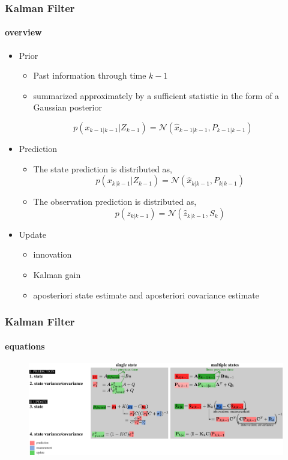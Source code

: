 \begin{frame}
\frametitle{Kalman Filter}
\framesubtitle{overview}
\logoCSIPCPL\mypagenum
	\begin{itemize}
		\item {\color{red}Prior}
			\begin{itemize}
				\item Past information through time $k-1$
				\item summarized approximately by a sufficient statistic in the form of a Gaussian posterior
			\end{itemize}
		\begin{equation*}
			p(x_{k-1|k-1}|Z_{k-1})=\mathcal{N}  (\hat{x}_{k-1|k-1}, P_{k-1|k-1})
		\end{equation*}
		\item {\color{red}Prediction}
			\begin{itemize}  
				\item The state prediction is distributed as,
				\begin{equation*}
					p(x_{k|k-1}|Z_{k-1})=\mathcal{N}  (\hat{x}_{k|k-1}, P_{k|k-1})
				\end{equation*}
				\item The observation prediction is distributed as,
				\begin{equation*}
					p(z_{k|k-1})=\mathcal{N}  (\hat{z}_{k|k-1}, S_k)
				\end{equation*}
			\end{itemize}
		\item {\color{red}Update}
			\begin{itemize} 
				\item innovation
				\item Kalman gain
				\item aposteriori state estimate and aposteriori covariance estimate
			\end{itemize}
	\end{itemize}
\end{frame}



\begin{frame}
\frametitle{Kalman Filter}
\framesubtitle{equations}
\logoCSIPCPL\mypagenum
	\begin{figure}
		\includegraphics[width=1.0\textwidth]{figs/TRK_KalmanFilter_equations.pdf}
	\end{figure}
\end{frame}

